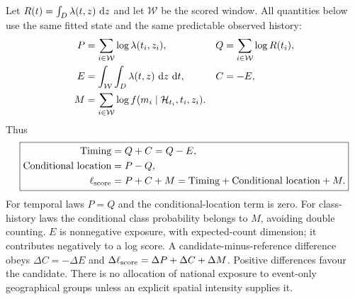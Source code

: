 Let $R(t)=\int_D\lambda(t,z)\,\mathop{}\!\mathrm{d} z$ and let $\mathcal W$ be the scored window. All quantities below use the same fitted state and the same predictable observed history:
\begin{align}
 P&=\sum_{i\in\mathcal W}\log\lambda(t_i,z_i),&
 Q&=\sum_{i\in\mathcal W}\log R(t_i),\nonumber\\
 E&=\int_{\mathcal W}\int_D\lambda(t,z)\,\mathop{}\!\mathrm{d} z\,\mathop{}\!\mathrm{d} t,& C&=-E,\label{eq:master-PQECM}\\
 M&=\sum_{i\in\mathcal W}\log f(m_i\mid\mathcal H_{t_i},t_i,z_i).&&\nonumber
\end{align}
Thus
\begin{equation}\boxed{\begin{aligned}
 \text{Timing}&=Q+C=Q-E,\\
 \text{Conditional location}&=P-Q,\\
 \ell_{\rm score}&=P+C+M=\text{Timing}+\text{Conditional location}+M.
\end{aligned}}\label{eq:master-score-identity}\end{equation}
For temporal laws $P=Q$ and the conditional-location term is zero. For class-history laws the conditional class probability belongs to $M$, avoiding double counting. $E$ is nonnegative exposure, with expected-count dimension; it contributes negatively to a log score. A candidate-minus-reference difference obeys $\Delta C=-\Delta E$ and $\Delta\ell_{\rm score}=\Delta P+\Delta C+\Delta M$. Positive differences favour the candidate. There is no allocation of national exposure to event-only geographical groups unless an explicit spatial intensity supplies it.

